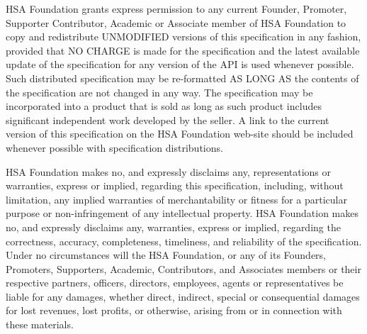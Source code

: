 \documentclass[oneside]{book}
\begin{document}
HSA Foundation grants express permission to any current Founder, Promoter,
Supporter Contributor, Academic or Associate member of HSA Foundation to copy
and redistribute UNMODIFIED versions of this specification in any fashion,
provided that NO CHARGE is made for the specification and the latest available
update of the specification for any version of the API is used whenever
possible. Such distributed specification may be re-formatted AS LONG AS the
contents of the specification are not changed in any way. The specification may
be incorporated into a product that is sold as long as such product includes
significant independent work developed by the seller. A link to the current
version of this specification on the HSA Foundation web-site should be included
whenever possible with specification distributions.

HSA Foundation makes no, and expressly disclaims any, representations or
warranties, express or implied, regarding this specification, including, without
limitation, any implied warranties of merchantability or fitness for a
particular purpose or non-infringement of any intellectual property. HSA
Foundation makes no, and expressly disclaims any, warranties, express or
implied, regarding the correctness, accuracy, completeness, timeliness, and
reliability of the specification. Under no circumstances will the HSA
Foundation, or any of its Founders, Promoters, Supporters, Academic,
Contributors, and Associates members or their respective partners, officers,
directors, employees, agents or representatives be liable for any damages,
whether direct, indirect, special or consequential damages for lost revenues,
lost profits, or otherwise, arising from or in connection with these materials.
\end{document}
